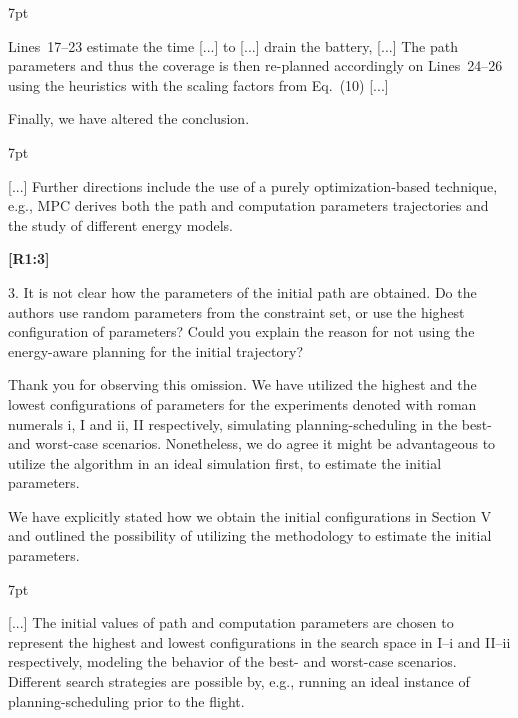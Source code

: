 \documentclass[10pt]{letter}
\newenvironment{formal}{%
  \def\FrameCommand{%
    \hspace{1pt}%
    {\color{red}\vrule width 2pt}%
    {\color{formalshade}\vrule width 4pt}%
    \colorbox{formalshade}%
  }%
  \MakeFramed{\advance\hsize-\width\FrameRestore}%
  \noindent\hspace{-4.55pt}%
  \begin{adjustwidth}{}{7pt}%
  \vspace{2pt}\vspace{2pt}%
}
{%
  \vspace{2pt}\end{adjustwidth}\endMakeFramed%
}
\begin{document}
{\begin{formal}
  Lines~{\color{red}17}--{\color{red}23} estimate the time [...] to [...] drain the battery, [...] The {\color{blue}path parameters and thus the} coverage is then re{\color{blue}-}planned accordingly on Lines~{\color{red}24}--{\color{red}26} using {\color{blue} the heuristics with the} %
  scaling factors from Eq.~({\color{red}10}) [...]

  \vspace*{1ex}
  \end{formal}

  Finally, we have altered the conclusion.

  \begin{formal}
  \color{black}
  [...] Further directions include {\color{blue}the use of a purely optimization-based technique, e.g., MPC derives both the path and computation parameters trajectories and} the study of different energy models.
  \vspace*{1ex}
  \end{formal}
}

{\hspace*{-4.5em}\textbf{[R1:3]}\vspace*{-1.9em}}

3. It is not clear how the parameters of the initial path are obtained. Do the authors use random parameters from the constraint set, or use the highest configuration of parameters? Could you explain the reason for not using the energy-aware planning for the initial trajectory?

{\color{blue}

{\hspace*{-4.5em}{[R1:3]}\vspace*{-1.9em}}

Thank you for observing this omission. We have utilized the highest and the lowest configurations of parameters for the experiments denoted with roman numerals i, I and ii, II respectively, simulating planning-scheduling in the best- and worst-case scenarios. Nonetheless, we do agree it might be advantageous to utilize the algorithm in an ideal simulation first, to estimate the initial parameters.

We have explicitly stated how we obtain the initial configurations in Section V and outlined the possibility of utilizing the methodology to estimate the initial parameters.

\begin{formal}
  \color{black} [...] {\color{blue} The initial values of path and computation parameters are chosen to represent the highest and lowest configurations in the search space in {\color{red}I}--{\color{red}i} and {\color{red}II}--{\color{red}ii} respectively, modeling the behavior of the best- and worst-case scenarios. Different search strategies are possible by, e.g., running an ideal instance of planning-scheduling prior to the flight.}
  \vspace*{1ex}
\end{formal}

}
\end{document}
